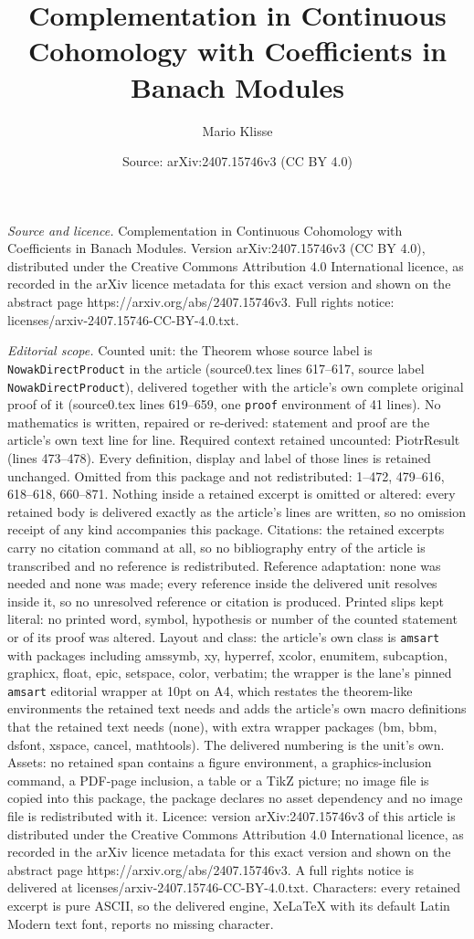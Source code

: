 \documentclass[10pt,a4paper]{amsart}
\title[Complementation in Continuous Cohomology with Coefficients i]{Complementation in Continuous Cohomology with Coefficients in Banach Modules}
\author{Mario Klisse}
\date{Source: arXiv:2407.15746v3 (CC BY 4.0)}
\begin{document}
\maketitle

\noindent\emph{Source and licence.} Complementation in Continuous Cohomology with Coefficients in Banach Modules. Version arXiv:2407.15746v3 (CC BY 4.0), distributed under the Creative Commons Attribution 4.0 International licence, as recorded in the arXiv licence metadata for this exact version and shown on the abstract page https://arxiv.org/abs/2407.15746v3. Full rights notice: licenses/arxiv-2407.15746-CC-BY-4.0.txt.\par\smallskip

\noindent\textit{Editorial scope.} Counted unit: the Theorem whose source label is \texttt{NowakDirectProduct} in the article (source0.tex lines 617--617, source label \texttt{NowakDirectProduct}), delivered together with the article's own complete original proof of it (source0.tex lines 619--659, one \texttt{proof} environment of 41 lines). No mathematics is written, repaired or re-derived: statement and proof are the article's own text line for line. Required context retained uncounted: PiotrResult (lines 473--478). Every definition, display and label of those lines is retained unchanged. Omitted from this package and not redistributed: 1--472, 479--616, 618--618, 660--871. Nothing inside a retained excerpt is omitted or altered: every retained body is delivered exactly as the article's lines are written, so no omission receipt of any kind accompanies this package. Citations: the retained excerpts carry no citation command at all, so no bibliography entry of the article is transcribed and no reference is redistributed. Reference adaptation: none was needed and none was made; every reference inside the delivered unit resolves inside it, so no unresolved reference or citation is produced. Printed slips kept literal: no printed word, symbol, hypothesis or number of the counted statement or of its proof was altered. Layout and class: the article's own class is \texttt{amsart} with packages including amssymb, xy, hyperref, xcolor, enumitem, subcaption, graphicx, float, epic, setspace, color, verbatim; the wrapper is the lane's pinned \texttt{amsart} editorial wrapper at 10pt on A4, which restates the theorem-like environments the retained text needs and adds the article's own macro definitions that the retained text needs (none), with extra wrapper packages (bm, bbm, dsfont, xspace, cancel, mathtools). The delivered numbering is the unit's own. Assets: no retained span contains a figure environment, a graphics-inclusion command, a PDF-page inclusion, a table or a TikZ picture; no image file is copied into this package, the package declares no asset dependency and no image file is redistributed with it. Licence: version arXiv:2407.15746v3 of this article is distributed under the Creative Commons Attribution 4.0 International licence, as recorded in the arXiv licence metadata for this exact version and shown on the abstract page https://arxiv.org/abs/2407.15746v3. A full rights notice is delivered at licenses/arxiv-2407.15746-CC-BY-4.0.txt. Characters: every retained excerpt is pure ASCII, so the delivered engine, XeLaTeX with its default Latin Modern text font, reports no missing character.
\end{document}
